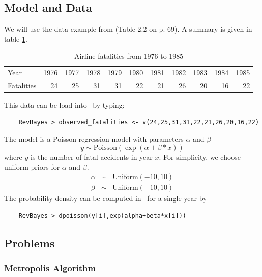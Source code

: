 \documentclass[11pt]{article}
\begin{document}
\subsection*{Model and Data}
We will use the data example from \cite{gelman95} (Table 2.2 on p. 69). 
A summary is given in table \ref{tab:airlineFatalities}.
\begin{table}[!hbtp]
\caption{Airline fatalities from 1976 to 1985}
\label{tab:airlineFatalities}
\smallskip
\begin{tabular}{ l | r r r r r r r r r r }
  \hline                       
  Year & 1976 & 1977 & 1978 & 1979 & 1980 & 1981 & 1982 & 1983 & 1984 & 1985 \\
  Fatalities & 24 & 25 & 31 & 31 & 22 & 21 & 26 & 20 & 16 & 22\\
  \hline  
\end{tabular}
\end{table}
This data can be load into \RevBayes~by typing:
{\tt \begin{snugshade*}
\begin{lstlisting}    
    RevBayes > observed_fatalities <- v(24,25,31,31,22,21,26,20,16,22)
\end{lstlisting}
\end{snugshade*}}

The model is a Poisson regression model with parameters $\alpha$ and $\beta$
\begin{equation*}
y \sim \text{Poisson}(\exp(\alpha+\beta*x))
\end{equation*} 
where $y$ is the number of fatal accidents in year $x$. 
For simplicity, we choose uniform priors for $\alpha$ and $\beta$.
\begin{eqnarray*}
\alpha & \sim & \text{Uniform}(-10,10)\\
\beta &  \sim & \text{Uniform}(-10,10)
\end{eqnarray*}
The probability density can be computed in \RevBayes~for a single year by
{\tt \begin{snugshade*}
\begin{lstlisting}    
    RevBayes > dpoisson(y[i],exp(alpha+beta*x[i]))
\end{lstlisting}
\end{snugshade*}}

\subsection*{Problems}

\subsubsection*{Metropolis Algorithm}%
\end{document}
